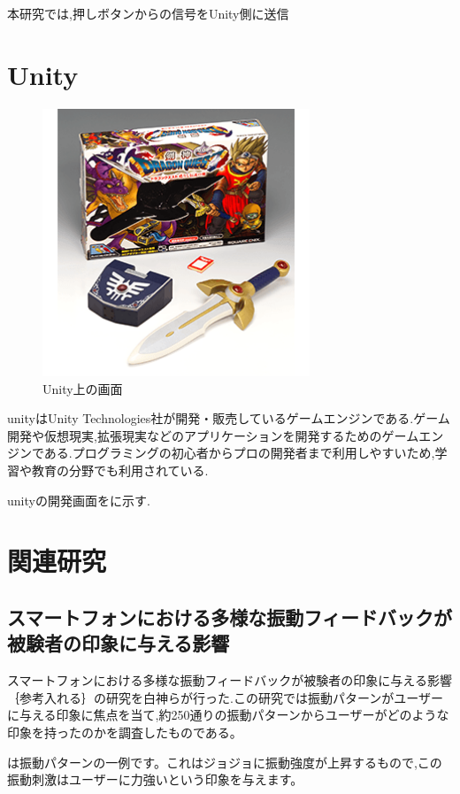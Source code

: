 本研究では,押しボタンからの信号をUnity側に送信


\section{Unity}

\begin{figure}[h]
\centering
\includegraphics[clip,width=8cm]{./fig/DQN.png}
\caption{Unity上の画面}\label{unity}
\end{figure}

unityはUnity Technologies社が開発・販売しているゲームエンジンである.ゲーム開発や仮想現実,拡張現実などのアプリケーションを開発するためのゲームエンジンである.プログラミングの初心者からプロの開発者まで利用しやすいため,学習や教育の分野でも利用されている.

unityの開発画面をに示す.



\section{関連研究}

\subsection{スマートフォンにおける多様な振動フィードバックが被験者の印象に与える影響}
スマートフォンにおける多様な振動フィードバックが被験者の印象に与える影響｛参考入れる｝の研究を白神らが行った.この研究では振動パターンがユーザーに与える印象に焦点を当て,約250通りの振動パターンからユーザーがどのような印象を持ったのかを調査したものである。

は振動パターンの一例です。これはジョジョに振動強度が上昇するもので,この振動刺激はユーザーに力強いという印象を与えます。



